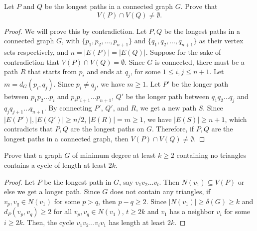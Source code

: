 \documentclass{article}
\newenvironment{problem}[2][Question]{\begin{trivlist}
\item[\hskip \labelsep {\bfseries #1}\hskip \labelsep {\bfseries #2.}]}{\end{trivlist}}
\begin{document}
\begin{problem}{4}
     Let $P$ and $Q$ be the longest paths in a connected graph $G$. Prove that
     \[V(P) \cap V(Q) \neq \emptyset.\]
\end{problem}
\begin{proof}
    We will prove this by contradiction. Let $P, Q$ be the longest paths in a connected graph $G$, with $\{p_1, p_2, \dots, p_{n+1}\}$ and $\{q_1, q_2, \dots, q_{n+1}\}$ as their vertex sets respectively, and $n = |E(P)| = |E(Q)|$.  Suppose for the sake of contradiction that $V(P) \cap V(Q) = \emptyset$. Since $G$ is connected, there must be a path $R$ that starts from $p_i$ and ends at $q_j$, for some $1 \leq i, j \leq n + 1$. Let $m = d_G(p_i, q_j)$. Since $p_i \neq q_j$, we have $m \geq 1$. Let $P'$ be the longer path between $p_1p_2\dots p_i$ and $p_ip_{i+1}\dots p_{n+1}$, $Q'$ be the longer path between $q_1q_2\dots q_j$ and $q_jq_{j+1}\dots q_{n+1}$. By connecting $P'$, $Q'$, and $R$, we get a new path $S$. Since $|E(P')|, |E(Q')| \geq n/2$, $|E(R)| = m \geq 1$, we have $|E(S)| \geq n + 1$, which contradicts that $P, Q$ are the longest paths on $G$.
    Therefore, if $P, Q$ are the longest paths in a connected graph, then $V(P) \cap V(Q) \neq \emptyset$.
\end{proof}

\newpage

\begin{problem}{5}
    Prove that a graph $G$ of minimum degree at least $k \geq 2$ containing no triangles contains a cycle of length at least $2k$.
\end{problem}
\begin{proof}
    Let $P$ be the longest path in $G$, say $v_1v_2\dots v_t$. Then $N(v_1) \subseteq V(P)$ or else we get a longer path. Since $G$ does not contain any triangles, if $v_p, v_q \in N(v_1)$ for some $p > q$, then $p - q \geq 2$. Since $|N(v_1)| \geq \delta(G) \geq k$ and $d_P(v_p, v_q) \geq 2$ for all $v_p, v_q \in N(v_1)$, $t \geq 2k$ and $v_1$ has a neighbor $v_i$ for some $i \geq 2k$. Then, the cycle $v_1 v_2 \dots v_i v_1$ has length at least $2k$.
\end{proof}
\end{document}
